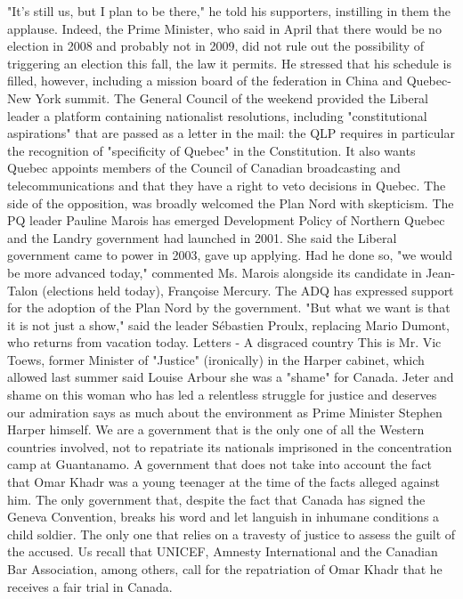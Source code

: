 "It's still us, but I plan to be there," he told his supporters, instilling in them the applause.
Indeed, the Prime Minister, who said in April that there would be no election in 2008 and probably not in 2009, did not rule out the possibility of triggering an election this fall, the law it permits.
He stressed that his schedule is filled, however, including a mission board of the federation in China and Quebec-New York summit.
The General Council of the weekend provided the Liberal leader a platform containing nationalist resolutions, including "constitutional aspirations" that are passed as a letter in the mail: the QLP requires in particular the recognition of "specificity of Quebec" in the Constitution.
It also wants Quebec appoints members of the Council of Canadian broadcasting and telecommunications and that they have a right to veto decisions in Quebec.
The side of the opposition, was broadly welcomed the Plan Nord with skepticism.
The PQ leader Pauline Marois has emerged Development Policy of Northern Quebec and the Landry government had launched in 2001.
She said the Liberal government came to power in 2003, gave up applying.
Had he done so, "we would be more advanced today," commented Ms. Marois alongside its candidate in Jean-Talon (elections held today), Françoise Mercury.
The ADQ has expressed support for the adoption of the Plan Nord by the government.
"But what we want is that it is not just a show," said the leader Sébastien Proulx, replacing Mario Dumont, who returns from vacation today.
Letters - A disgraced country
This is Mr. Vic Toews, former Minister of "Justice" (ironically) in the Harper cabinet, which allowed last summer said Louise Arbour she was a "shame" for Canada.
Jeter and shame on this woman who has led a relentless struggle for justice and deserves our admiration says as much about the environment as Prime Minister Stephen Harper himself.
We are a government that is the only one of all the Western countries involved, not to repatriate its nationals imprisoned in the concentration camp at Guantanamo.
A government that does not take into account the fact that Omar Khadr was a young teenager at the time of the facts alleged against him.
The only government that, despite the fact that Canada has signed the Geneva Convention, breaks his word and let languish in inhumane conditions a child soldier.
The only one that relies on a travesty of justice to assess the guilt of the accused.
Us recall that UNICEF, Amnesty International and the Canadian Bar Association, among others, call for the repatriation of Omar Khadr that he receives a fair trial in Canada.
